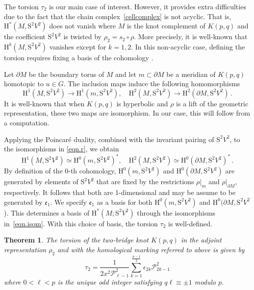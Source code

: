 \documentclass{amsart}
\renewcommand{\S}{\mathrm{S}}
\def\calP{\mathcal{P}}
\newtheorem{Theorem}{Theorem}[section]
\theoremstyle{definition}
\begin{document}
The torsion $\tau_2$ is our main case of interest. However, it provides extra difficulties due to the fact that the chain complex~\eqref{cellcomplex} is not acyclic. That is, $\mathrm{H}^\ast(M,\S^2 V^2)$ does not vanish where $M$ is the knot complement of $K(p,q)$ and the coefficient $\S^2V^2$ is twisted by $\rho_2 = s_2 \circ \rho$.
More precisely, it is well-known that $\mathrm{H}^k(M,\S^2V^2)$ vanishes except for $k=1,2$. In this non-acyclic case, defining the torsion requires fixing a basis of the cohomology \cite{PortiThesis}.

Let $\partial M$ be the boundary torus of $M$ and let $m\subset \partial M$ be a meridian of $K(p,q)$ homotopic to $u\in G$. The inclusion maps induce the following homomorphisms
\begin{equation}
\label{eqn.r}
  \mathrm{H}^1(M,\S^2V^2) \to \mathrm{H}^1(m,\S^2V^2), \quad
  \mathrm{H}^2(M,\S^2V^2)\to \mathrm{H}^2(\partial M,\S^2V^2) \,.
\end{equation}
It is well-known that when $K(p,q)$ is hyperbolic and $\rho$ is a lift of the geometric representation, these two maps are isomorphism. In our case, this will follow from a computation. 

Applying the Poincar\'{e} duality, combined with the invariant pairing of $\S^2V^2$, to the isomorphisms in  \eqref{eqn.r}, we obtain
\begin{equation}
    \label{eqn.isom}
    \mathrm{H}^1(M,\S^2V^2)\simeq \mathrm{H}^0(m,\S^2V^2)^*, \quad \mathrm{H}^2(M,\S^2V^2)\simeq \mathrm{H}^0(\partial M,\S^2V^2)^*\,.
\end{equation}
By definition of the 0-th cohomology, $\mathrm{H}^0(m,\S^2V^2)$ and $\mathrm{H}^0(\partial M,\S^2V^2)$ are generated by elements of $\S^2V^2$ that are fixed by the restrictions $\rho|_m$ and $\rho|_{\partial M}$, respectively. It follows that both are 1-dimensional and may be assume to be generated by $\mathfrak{e}_1$. We specify $\mathfrak{e}_1$ as a basis for both $\mathrm{H}^0(m,\S^2V^2)$ and $\mathrm{H}^0(\partial M,\S^2V^2$). This determines a basis of $\mathrm{H}^\ast(M;\S^2V^2)$ through the isomorphisms in~\eqref{eqn.isom}. With this choice of basis, the torsion $\tau_2$ is well-defined. 

\begin{Theorem}\label{toradj}
    The torsion of the two-bridge knot $K(p,q)$ in the adjoint representation $\rho_2$ and with the homological marking referred to above is given by 
    $$\tau_2=\frac{1}{2x^2\calP_{\ell-1}^2}\sum_{k=1}^{\frac{p-1}{2}}\epsilon_{2k}\calP_{2k-1}^2$$
    where $0<\ell<p$ is the unique odd integer satisfying $q\ell \equiv \pm 1$ modulo $p$.
\end{Theorem}
\end{document}
